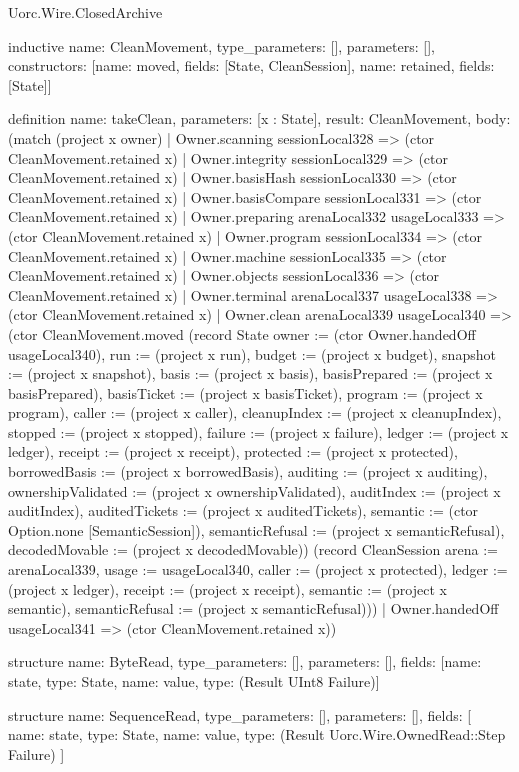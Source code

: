 \begin{lexlean}{Uorc.Wire.ClosedArchive}
\begin{semanticmodule}
inductive{
  name: CleanMovement,
  type_parameters: [],
  parameters: [],
  constructors: [{name: moved, fields: [State, CleanSession]}, {name: retained, fields: [State]}]
}

definition{
  name: takeClean,
  parameters: [x : State],
  result: CleanMovement,
  body: (match (project x owner)
    | Owner.scanning sessionLocal328 => (ctor CleanMovement.retained x)
    | Owner.integrity sessionLocal329 => (ctor CleanMovement.retained x)
    | Owner.basisHash sessionLocal330 => (ctor CleanMovement.retained x)
    | Owner.basisCompare sessionLocal331 => (ctor CleanMovement.retained x)
    | Owner.preparing arenaLocal332 usageLocal333 => (ctor CleanMovement.retained x)
    | Owner.program sessionLocal334 => (ctor CleanMovement.retained x)
    | Owner.machine sessionLocal335 => (ctor CleanMovement.retained x)
    | Owner.objects sessionLocal336 => (ctor CleanMovement.retained x)
    | Owner.terminal arenaLocal337 usageLocal338 => (ctor CleanMovement.retained x)
    | Owner.clean arenaLocal339 usageLocal340 => (ctor CleanMovement.moved (record State {owner := (ctor Owner.handedOff usageLocal340), run := (project x run), budget := (project x budget), snapshot := (project x snapshot), basis := (project x basis), basisPrepared := (project x basisPrepared), basisTicket := (project x basisTicket), program := (project x program), caller := (project x caller), cleanupIndex := (project x cleanupIndex), stopped := (project x stopped), failure := (project x failure), ledger := (project x ledger), receipt := (project x receipt), protected := (project x protected), borrowedBasis := (project x borrowedBasis), auditing := (project x auditing), ownershipValidated := (project x ownershipValidated), auditIndex := (project x auditIndex), auditedTickets := (project x auditedTickets), semantic := (ctor Option.none [SemanticSession]), semanticRefusal := (project x semanticRefusal), decodedMovable := (project x decodedMovable)}) (record CleanSession {arena := arenaLocal339, usage := usageLocal340, caller := (project x protected), ledger := (project x ledger), receipt := (project x receipt), semantic := (project x semantic), semanticRefusal := (project x semanticRefusal)}))
    | Owner.handedOff usageLocal341 => (ctor CleanMovement.retained x))
}

structure{
  name: ByteRead,
  type_parameters: [],
  parameters: [],
  fields: [{name: state, type: State}, {name: value, type: (Result UInt8 Failure)}]
}

structure{
  name: SequenceRead,
  type_parameters: [],
  parameters: [],
  fields: [
    {name: state, type: State},
    {name: value, type: (Result Uorc.Wire.OwnedRead::Step Failure)}
  ]
}


\end{semanticmodule}
\end{lexlean}
